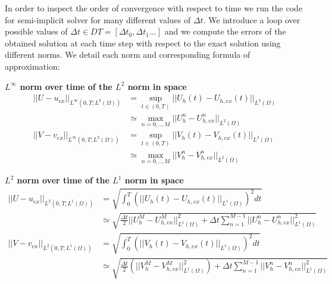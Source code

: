 In order to inspect the order of convergence with respect to time we run the code for semi-implicit solver for many different values of $\Delta t$. We introduce a loop over possible values of $\Delta t \in  DT = [\Delta t_0,\Delta t_1 ...]$ and we compute the errors of the obtained solution at each time step with respect to the exact solution using different norms. We detail each norm and corresponding formula of approximation:

\textbf{$L^{\infty}$ norm over time of the $L^2$ norm in space}
\begin{equation}\begin{aligned}
  ||U-u_{ex}||_{L^{\infty}\left(0, T; L^2\left(\Omega\right) \right)} & = \sup_{t \in (0, T)} ||U_h(t)-U_{h,ex}(t)||_{L^2\left(\Omega\right)} \\ & \simeq \max_{n = 0, .., M} ||U_h^n - U_{h,ex}^n||_{L^2(\Omega)} \\
  ||V-v_{ex}||_{L^{\infty}\left(0, T; L^2\left(\Omega\right) \right)} & = \sup_{t \in (0, T)} ||V_h(t)-V_{h,ex}(t)||_{L^2\left(\Omega\right)}  \\ & \simeq \max_{n = 0, .., M} ||V_h^n - V_{h,ex}^n||_{L^2(\Omega)}
\end{aligned} \end{equation}

\textbf{ $L^2$ norm over time of the $L^1$ norm in space}
\begin{equation}\label{eq:norm2}\begin{aligned}
  ||U-u_{ex}||_{L^2\left(0, T; L^1\left(\Omega\right) \right)} & = \sqrt{\int_0^{T} \left( ||U_h(t)-U_{h,ex}(t)||_{L^1\left(\Omega\right)} \right)^2 dt} \\ & \simeq \sqrt{ \frac{\Delta t}{2} ||U_h^M- U_{h,ex}^M||_{L^1\left(\Omega\right)}^2 + \Delta t \sum_{n = 1}^{M-1} ||U_h^n - U_{h, ex}^n||_{L^1\left(\Omega\right)}^2 } \\
  ||V-v_{ex}||_{L^2\left(0, T; L^1\left(\Omega\right) \right)} & = \sqrt {\int_0^{T} \left(||V_h(t)-V_{h,ex}(t)||_{L^1\left(\Omega\right)}\right)^2 dt }\\ & \simeq \sqrt{ \frac{\Delta t}{2} \left( ||V_h^M- V_{h,ex}^M||_{L^1\left(\Omega\right)}^2 \right) + \Delta t \sum_{n = 1}^{M-1} ||V_h^n - V_{h, ex}^n||_{L^1\left(\Omega\right)}^2} \\
\end{aligned} \end{equation}

